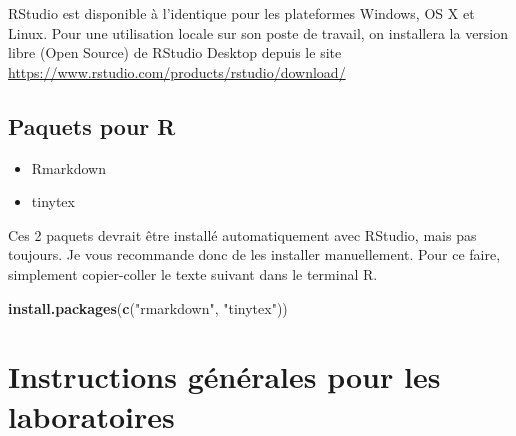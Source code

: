 \documentclass[12pt,]{book}
\newenvironment{Shaded}{\begin{snugshade}}{\end{snugshade}}
\newcommand{\KeywordTok}[1]{\textcolor[rgb]{0.27,0.27,0.27}{\textbf{#1}}}
\newcommand{\NormalTok}[1]{#1}
\newcommand{\StringTok}[1]{\textcolor[rgb]{0.5,0.5,0.5}{#1}}
\providecommand{\tightlist}{%
  \setlength{\itemsep}{0pt}\setlength{\parskip}{0pt}}
\begin{document}
RStudio est disponible à l'identique pour les plateformes Windows, OS X et Linux.
Pour une utilisation locale sur son poste de travail, on installera la version libre (Open Source) de RStudio Desktop depuis le site
\url{https://www.rstudio.com/products/rstudio/download/}

\hypertarget{paquets-pour-r}{%
\subsection*{Paquets pour R}\label{paquets-pour-r}}


\begin{itemize}
\tightlist
\item
  Rmarkdown
\item
  tinytex
\end{itemize}

Ces 2 paquets devrait être installé automatiquement avec RStudio, mais pas toujours. Je vous recommande donc de les installer manuellement. Pour ce faire, simplement copier-coller le texte suivant dans le terminal R.

\begin{Shaded}
\begin{Highlighting}[]
\KeywordTok{install.packages}\NormalTok{(}\KeywordTok{c}\NormalTok{(}\StringTok{"rmarkdown"}\NormalTok{, }\StringTok{"tinytex"}\NormalTok{))}
\end{Highlighting}
\end{Shaded}

\hypertarget{instructions-guxe9nuxe9rales-pour-les-laboratoires}{%
\section*{Instructions générales pour les laboratoires}\label{instructions-guxe9nuxe9rales-pour-les-laboratoires}}
\end{document}

